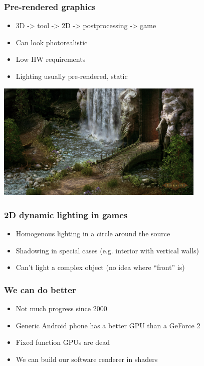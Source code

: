 \documentclass{beamer}
\begin{document}
\begin{frame}\frametitle{Pre-rendered graphics}

\begin{itemize}
\item
  3D -\textgreater{} tool -\textgreater{} 2D -\textgreater{}
  postprocessing -\textgreater{} game
\item
  Can look photorealistic
\item
  Low HW requirements
\item
  Lighting usually pre-rendered, static
\end{itemize}

\begin{center}
\includegraphics[width=0.75\textwidth]{eternity.jpg}
\end{center}

\end{frame}

\begin{frame}\frametitle{2D dynamic lighting in games}

\begin{itemize}
\item
  Homogenous lighting in a circle around the source
\item
  Shadowing in special cases (e.g. interior with vertical walls)
\item
  Can't light a complex object (no idea where ``front'' is)
\end{itemize}

\end{frame}

\begin{frame}\frametitle{We can do better}

\begin{itemize}
\item
  Not much progress since 2000
\item
  Generic Android phone has a better GPU than a GeForce 2
\item
  Fixed function GPUs are dead
\item
  We can build our software renderer in shaders
\end{itemize}

\end{frame}
\end{document}
